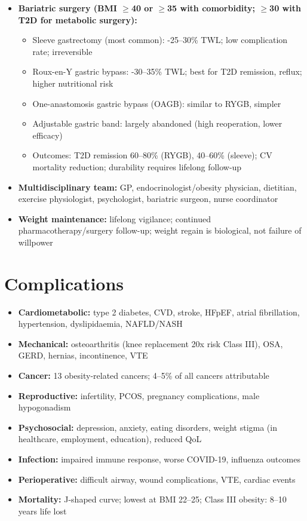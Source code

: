 \begin{itemize}
    \item \textbf{Bariatric surgery (BMI $\ge$40 or $\ge$35 with comorbidity; $\ge$30 with T2D for metabolic surgery):}
    \begin{itemize}
        \item Sleeve gastrectomy (most common): -25--30\% TWL; low complication rate; irreversible
        \item Roux-en-Y gastric bypass: -30--35\% TWL; best for T2D remission, reflux; higher nutritional risk
        \item One-anastomosis gastric bypass (OAGB): similar to RYGB, simpler
        \item Adjustable gastric band: largely abandoned (high reoperation, lower efficacy)
        \item Outcomes: T2D remission 60--80\% (RYGB), 40--60\% (sleeve); CV mortality reduction; durability requires lifelong follow-up
    \end{itemize}
    \item \textbf{Multidisciplinary team:} GP, endocrinologist/obesity physician, dietitian, exercise physiologist, psychologist, bariatric surgeon, nurse coordinator
    \item \textbf{Weight maintenance:} lifelong vigilance; continued pharmacotherapy/surgery follow-up; weight regain is biological, not failure of willpower
\end{itemize}

\section*{Complications}
\begin{itemize}
    \item \textbf{Cardiometabolic:} type 2 diabetes, CVD, stroke, HFpEF, atrial fibrillation, hypertension, dyslipidaemia, NAFLD/NASH
    \item \textbf{Mechanical:} osteoarthritis (knee replacement 20x risk Class III), OSA, GERD, hernias, incontinence, VTE
    \item \textbf{Cancer:} 13 obesity-related cancers; 4--5\% of all cancers attributable
    \item \textbf{Reproductive:} infertility, PCOS, pregnancy complications, male hypogonadism
    \item \textbf{Psychosocial:} depression, anxiety, eating disorders, weight stigma (in healthcare, employment, education), reduced QoL
    \item \textbf{Infection:} impaired immune response, worse COVID-19, influenza outcomes
    \item \textbf{Perioperative:} difficult airway, wound complications, VTE, cardiac events
    \item \textbf{Mortality:} J-shaped curve; lowest at BMI 22--25; Class III obesity: 8--10 years life lost
\end{itemize}

